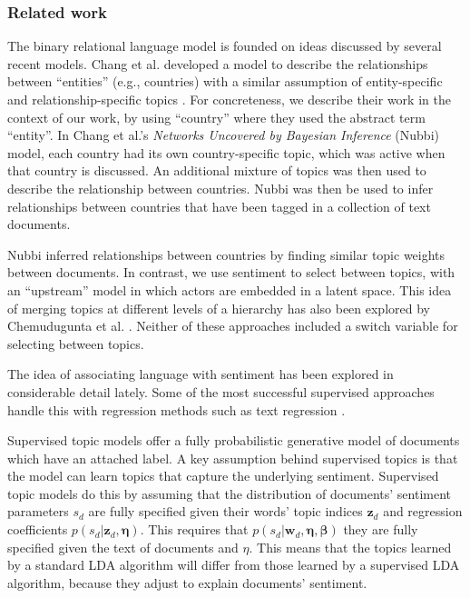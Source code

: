 \subsubsection{Related work}
The binary relational language model is founded on ideas discussed by
several recent models.  Chang et al. developed a model to describe the
relationships between ``entities'' (e.g., countries) with a similar
assumption of entity-specific and relationship-specific topics
\cite{chang:2009nubbi}.  For concreteness, we describe their work in
the context of our work, by using ``country'' where they used the
abstract term ``entity''.  In Chang et al.'s \emph{Networks Uncovered
  by Bayesian Inference} (Nubbi) model, each country had its own
country-specific topic, which was active when that country is
discussed.  An additional mixture of topics was then used to describe
the relationship between countries.  Nubbi was then be used to infer
relationships between countries that have been tagged in a collection
of text documents.

Nubbi inferred relationships between countries by finding similar
topic weights between documents. In contrast, we use sentiment to
select between topics, with an ``upstream'' model in which actors are
embedded in a latent space. This idea of merging topics at different
levels of a hierarchy has also been explored by Chemudugunta et
al. \cite{chemudugunta:2009}.  Neither of these approaches included a
switch variable for selecting between topics.

The idea of associating language with sentiment has been explored in
considerable detail lately.  Some of the most successful supervised
approaches handle this with regression methods such as text regression
\cite{kogan:2009}.

Supervised topic models \cite{blei:2008} offer a fully probabilistic
generative model of documents which have an attached label.  A key
assumption behind supervised topics is that the model can learn topics
that capture the underlying sentiment.  Supervised topic models do
this by assuming that the distribution of documents' sentiment
parameters $s_d$ are fully specified given their words' topic indices
$\bm z_d$ and regression coefficients $p(s_d | \bm z_d, \bm \eta)$.
This requires that $p(s_d | \bm w_d, \bm \eta, \bm \beta)$ they are
fully specified given the text of documents and $\eta$. This means
that the topics learned by a standard LDA algorithm will differ from
those learned by a supervised LDA algorithm, because they adjust to
explain documents' sentiment.

